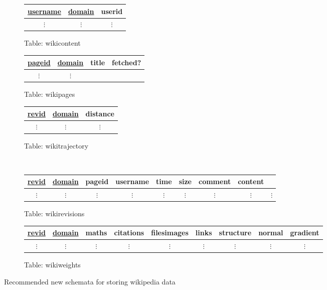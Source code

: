 \begin{figure}
  \label{fig:database-new}
  \centering
  \begin{subfigure}[b!]{0.3\linewidth}
    \centering
    \begin{tabular}{ccc}
      \toprule
      \underline{username} & \underline{domain} & userid\\
      \midrule
      $\vdots$ & $\vdots$ & $\vdots$\\
    \end{tabular}
    \caption{Table: wikicontent}
  \end{subfigure}
  \begin{subfigure}[b!]{0.3\linewidth}
    \centering
    \begin{tabular}{cccc}
      \toprule
      \underline{pageid} & \underline{domain} & title & fetched? \\
      \midrule
      $\vdots$ & $\vdots$\\
    \end{tabular}
    \caption{Table: wikipages}
  \end{subfigure}
  \begin{subfigure}[b!]{0.3\linewidth}
    \centering
    \begin{tabular}{ccc}
      \toprule
      \underline{revid} & \underline{domain} & distance\\
      \midrule
      $\vdots$ & $\vdots$ & $\vdots$ \\
    \end{tabular}
    \caption{Table: wikitrajectory}
  \end{subfigure}\\
  \vspace{10 mm}
  \begin{subfigure}[b!]{\linewidth}
    \centering
    \begin{tabular}{ccccccccc}
      \toprule
      \underline{revid} & \underline{domain} & pageid & username & time & size &
      comment & content \\ 
      \midrule
      $\vdots$ & $\vdots$ & $\vdots$ & $\vdots$ & $\vdots$ & $\vdots$ & $\vdots$
      & $\vdots$ & $\vdots$ \\
    \end{tabular}
    \caption{Table: wikirevisions}
  \end{subfigure}

  \begin{subfigure}[b!]{\linewidth}
    \centering
    \begin{tabular}{ccccccccc}
      \toprule
      \underline{revid} & \underline{domain} & maths & citations & filesimages & links &
      structure & normal & gradient\\
      \midrule
      $\vdots$ & $\vdots$ & $\vdots$ & $\vdots$ & $\vdots$ & $\vdots$ &
      $\vdots$ & $\vdots$ & $\vdots$ \\
    \end{tabular}
    \caption{Table: wikiweights} 
  \end{subfigure}
  \caption{Recommended new schemata for storing wikipedia data}
\end{figure}

